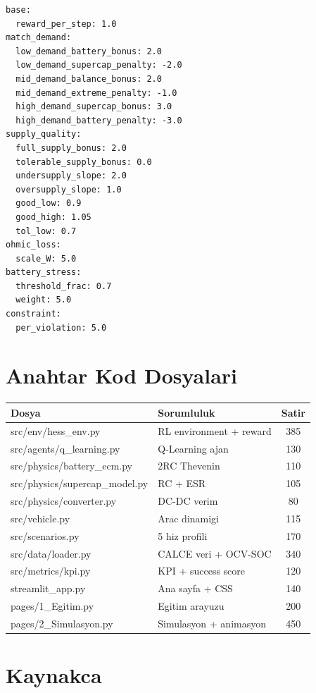 \documentclass[11pt,a4paper]{article}
\begin{document}
\begin{lstlisting}[style=yaml]
base:
  reward_per_step: 1.0
match_demand:
  low_demand_battery_bonus: 2.0
  low_demand_supercap_penalty: -2.0
  mid_demand_balance_bonus: 2.0
  mid_demand_extreme_penalty: -1.0
  high_demand_supercap_bonus: 3.0
  high_demand_battery_penalty: -3.0
supply_quality:
  full_supply_bonus: 2.0
  tolerable_supply_bonus: 0.0
  undersupply_slope: 2.0
  oversupply_slope: 1.0
  good_low: 0.9
  good_high: 1.05
  tol_low: 0.7
ohmic_loss:
  scale_W: 5.0
battery_stress:
  threshold_frac: 0.7
  weight: 5.0
constraint:
  per_violation: 5.0
\end{lstlisting}

\section{Anahtar Kod Dosyalari}

\begin{center}
\begin{tabular}{llc}
\toprule
Dosya & Sorumluluk & Satir \\
\midrule
src/env/hess\_env.py & RL environment + reward & 385 \\
src/agents/q\_learning.py & Q-Learning ajan & 130 \\
src/physics/battery\_ecm.py & 2RC Thevenin & 110 \\
src/physics/supercap\_model.py & RC + ESR & 105 \\
src/physics/converter.py & DC-DC verim & 80 \\
src/vehicle.py & Arac dinamigi & 115 \\
src/scenarios.py & 5 hiz profili & 170 \\
src/data/loader.py & CALCE veri + OCV-SOC & 340 \\
src/metrics/kpi.py & KPI + success score & 120 \\
streamlit\_app.py & Ana sayfa + CSS & 140 \\
pages/1\_Egitim.py & Egitim arayuzu & 200 \\
pages/2\_Simulasyon.py & Simulasyon + animasyon & 450 \\
\bottomrule
\end{tabular}
\end{center}

\section{Kaynakca}
\end{document}
